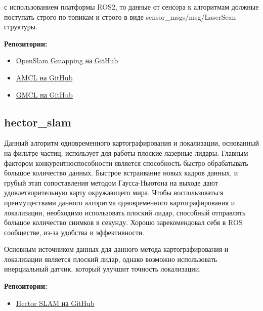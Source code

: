 \documentclass[a4paper, 14pt]{extreport}
\begin{document}
с использованием платформы ROS2, то данные от сенсора к алгоритмам должные поступать строго по топикам и строго в виде 
sensor\_msgs/msg/LaserScan структуры.
\par\noindent\textbf{Репозитории:}
\begin{itemize}
        \item \href{https://github.com/Project-MANAS/slam_gmapping}{OpenSlam Gmapping на GitHub}
        \item \href{https://github.com/ros-navigation/navigation2/tree/main/nav2_amcl}{AMCL на GitHub}
        \item \href{https://github.com/adler-1994/gmcl}{GMCL на GitHub}
\end{itemize}
\subsection{hector\_slam}
\par Данный алгоритм одновременного картографирования и локализации\cite{hectorPap}, основанный на фильтре частиц, использует для работы плоские
лазерные лидары. Главным фактором конкурентноспособности является способность быстро обрабатывать большое количество данных. 
Быстрое встраивание новых кадров данных, и грубый этап сопоставления методом Гаусса-Ньютона на выходе дают удовлетворительную карту
окружающего мира. Чтобы воспользоваться преимуществами данного алгоритма одновременного картографирования и локализации, необходимо 
использовать плоский лидар, способный отправлять большое количество снимков в секунду. Хорошо зарекомендовал себя в ROS сообществе,
из-за удобства и эффективности.
\par\noindent Основным источником данных для данного метода картографирования и локализации является плоский лидар, однако возможно
использовать инерциальный датчик, который улучшит точность локализации.
\par\noindent\textbf{Репозитории:}
\begin{itemize}
        \item \href{https://github.com/tu-darmstadt-ros-pkg/hector_slam}{Hector SLAM на GitHub}
\end{itemize}
\end{document}
